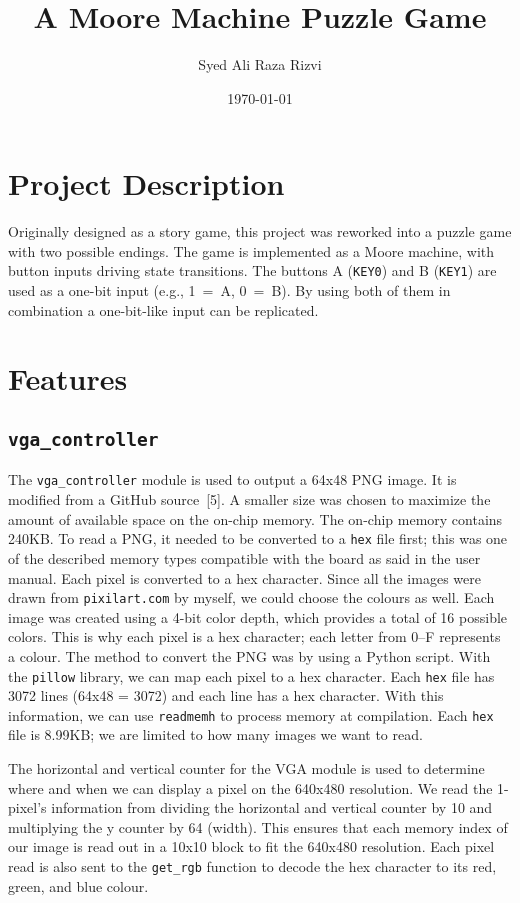 \documentclass{article}
\title{A Moore Machine Puzzle Game}
\author{Syed Ali Raza Rizvi}
\date{\today}
\begin{document}
\maketitle

\section{Project Description}

Originally designed as a story game, this project was reworked into a puzzle game with two possible endings. The game is implemented as a Moore machine, with button inputs driving state transitions. The buttons A (\texttt{KEY0}) and B (\texttt{KEY1}) are used as a one-bit input (e.g., 1~=~A, 0~=~B). By using both of them in combination a one-bit-like input can be replicated.

\section{Features}

\subsection{\texttt{vga\_controller}}

The \texttt{vga\_controller} module is used to output a 64x48 PNG image. It is modified from a GitHub source~[5]. A smaller size was chosen to maximize the amount of available space on the on-chip memory. The on-chip memory contains 240KB. To read a PNG, it needed to be converted to a \texttt{hex} file first; this was one of the described memory types compatible with the board as said in the user manual. Each pixel is converted to a hex character. Since all the images were drawn from \texttt{pixilart.com} by myself, we could choose the colours as well. Each image was created using a 4-bit color depth, which provides a total of 16 possible colors. This is why each pixel is a hex character; each letter from 0--F represents a colour. The method to convert the PNG was by using a Python script. With the \texttt{pillow} library, we can map each pixel to a hex character. Each \texttt{hex} file has 3072 lines (64x48 = 3072) and each line has a hex character. With this information, we can use \texttt{readmemh} to process memory at compilation. Each \texttt{hex} file is 8.99KB; we are limited to how many images we want to read.

The horizontal and vertical counter for the VGA module is used to determine where and when we can display a pixel on the 640x480 resolution. We read the 1-pixel’s information from dividing the horizontal and vertical counter by 10 and multiplying the y counter by 64 (width). This ensures that each memory index of our image is read out in a 10x10 block to fit the 640x480 resolution. Each pixel read is also sent to the \texttt{get\_rgb} function to decode the hex character to its red, green, and blue colour.
\end{document}
